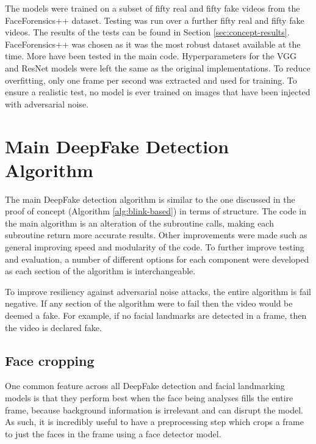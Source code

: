 The models were trained on a subset of fifty real and fifty fake videos from the FaceForensics++ dataset\cite{dufour2019deepfakes}. Testing was run over a further fifty real and fifty fake videos. The results of the tests can be found in Section \ref{sec:concept-results}. FaceForensics++ was chosen as it was the most robust dataset available at the time. More have been tested in the main code. Hyperparameters for the VGG and ResNet models were left the same as the original implementations. To reduce overfitting, only one frame per second was extracted and used for training. To ensure a realistic test, no model is ever trained on images that have been injected with adversarial noise.

\section{Main DeepFake Detection Algorithm}


The main DeepFake detection algorithm is similar to the one discussed in the proof of concept (Algorithm \ref{alg:blink-based}) in terms of structure. The code in the main algorithm is an alteration of the subroutine calls, making each subroutine return more accurate results. Other improvements were made such as general improving speed and modularity of the code. To further improve testing and evaluation, a number of different options for each component were developed as each section of the algorithm is interchangeable. 

To improve resiliency against adversarial noise attacks, the entire algorithm is fail negative. If any section of the algorithm were to fail then the video would be deemed a fake. For example, if no facial landmarks are detected in a frame, then the video is declared fake.

\subsection{Face cropping}
\label{sec:face-cropping}

One common feature across all DeepFake detection and facial landmarking models is that they perform best when the face being analyses fills the entire frame, because background information is irrelevant and can disrupt the model. As such, it is incredibly useful to have a preprocessing step which crops a frame to just the faces in the frame using a face detector model. 

